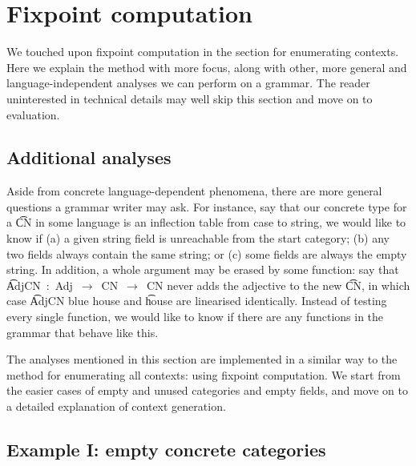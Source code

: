 \section{Fixpoint computation}
\label{sec:moreFP}

We touched upon fixpoint computation in the section for enumerating
contexts. Here we explain the method with more focus, along with
other, more general and language-independent analyses we can perform
on a grammar. The reader uninterested in technical details may well
skip this section and move on to evaluation.

\subsection{Additional analyses}

Aside from concrete language-dependent phenomena, there are more
general questions a grammar writer may ask. For instance, say that our
concrete type for a \t{CN} in some language is an inflection table
from case to string, we would like to know if (a) a given string field
is unreachable from the start category; (b) any two fields always
contain the same string; or (c) some fields are always the empty
string.  In addition, a whole argument may be erased by some function:
say that \t{AdjCN~:~Adj~$\rightarrow$~CN~$\rightarrow$~CN} never adds
the adjective to the new \t{CN}, in which case \t{AdjCN blue house}
and \t{house} are linearised identically. Instead of testing every
single function, we would like to know if there are any functions in
the grammar that behave like this.


The analyses mentioned in this section are implemented in a similar
way to the method for enumerating all contexts: using fixpoint
computation. We start from the easier cases of empty and unused categories and empty fields, and move on to a detailed explanation of context generation.

\subsection{Example I: empty concrete categories}

